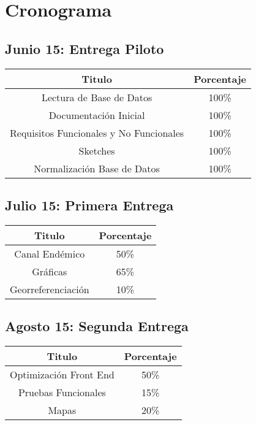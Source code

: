 \section{Cronograma}

\subsection{Junio 15: Entrega Piloto}

\begin{center}
\begin{tabular}{|c|c|}
\hline 
Titulo & Porcentaje \\ \hline
\hline
Lectura de Base de Datos & 100\% \\ \hline
Documentación Inicial & 100\% \\ \hline
Requisitos Funcionales y No Funcionales & 100\%\\ \hline
Sketches & 100\%\\ \hline
Normalización Base de Datos & 100\%\\ \hline

\end{tabular}
\end{center}

\subsection{Julio 15: Primera Entrega}

\begin{center}
\begin{tabular}{|c|c|}
\hline 
Titulo & Porcentaje \\ \hline
\hline
Canal Endémico & 50\% \\ \hline
Gráficas & 65\% \\ \hline
Georreferenciación & 10\% \\ \hline
\end{tabular}
\end{center}


\subsection{Agosto 15: Segunda Entrega }


\begin{center}
\begin{tabular}{|c|c|}
\hline 
Titulo & Porcentaje \\ \hline
\hline
Optimización Front End &  50\% \\ \hline
Pruebas Funcionales & 15\% \\ \hline
Mapas & 20\% \\ \hline
\end{tabular}
\end{center}

